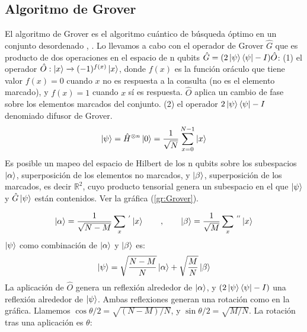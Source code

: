 \begin{appendix}
\chapter{Algoritmo de Grover}\label{sec:Grover}

El algoritmo de Grover es el algoritmo cuántico de búsqueda óptimo en un conjunto desordenado \cite{grover1996fast}, \cite{nielsen2002quantum}. Lo llevamos a cabo con el operador de Grover $\hat{G}$ que es producto de dos operaciones en el espacio de n qubits $\hat{G}=(2\ket{\psi}\bra{\psi}-I)\hat{O}$: (1) el operador $\hat{O}:\ket{x}\xrightarrow{}(-1)^{f(x)}\ket{x}$, donde $f(x)$ es la función oráculo que tiene valor $f(x)=0$ cuando $x$ no es respuesta a la consulta (no es el elemento marcado), y $f(x)=1$ cuando $x$ sí es respuesta. $\hat{O}$ aplica un cambio de fase sobre los elementos marcados del conjunto. (2) el operador $2\ket{\psi}\bra{\psi}-I$ denomiado difusor de Grover.
\begin{equation}
\ket{\psi}=\hat{H}^{\otimes n}\ket{0}=\frac{1}{\sqrt{N}}\sum_{x=0}^{N-1}\ket{x}
\end{equation}
\noindent Es posible un mapeo del espacio de Hilbert de los n qubits sobre los subespacios $\ket{\alpha}$, superposición de los elementos no marcados, y $\ket{\beta}$, superposición de los marcados, es decir $\mathbb{R}^2$, cuyo producto tensorial genera un subespacio en el que $\ket{\psi}$ y $\hat{G}\ket{\psi}$ están contenidos. Ver la gráfica (\ref{gr:Grover}).

\begin{equation}
    \ket{\alpha}=\frac{1}{\sqrt{N-M}}\sum_x\,^{'}\ket{x}\qquad,\qquad    \ket{\beta}=\frac{1}{\sqrt{M}}\sum_x\,^{''}\ket{x}
\end{equation}
$\ket{\psi}$ como combinación de $\ket{\alpha}$ y $\ket{\beta}$ es:
\begin{equation}
\ket{\psi}=\sqrt{\dfrac{N-M}{N}}\ket{\alpha}+\sqrt{\dfrac{M}{N}}\ket{\beta}
\label{ec:GroverInicial}
\end{equation}{}
La aplicación de $\hat{O}$ genera un reflexión alrededor de $\ket{\alpha}$, y $(2\ket{\psi}\bra{\psi}-I)$ una reflexión alrededor de $\ket{\psi}$. Ambas reflexiones generan una rotación como en la gráfica. Llamemos $\cos{\theta/2}=\sqrt{(N-M)/N}$, y $\sin{\theta/2}=\sqrt{M/N}$. La rotación tras una aplicación es $\theta$:


\end{appendix}

